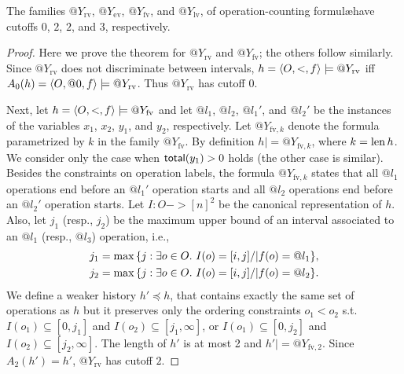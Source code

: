 \begin{theorem}
  \label{lem:cutoff}

  The families $@Y_\mathrm{rv}$, $@Y_\mathrm{ev}$, $@Y_\mathrm{fv}$, and
  $@Y_\mathrm{lv}$, of operation-counting formul\ae have cutoffs $0$, $2$, $2$,
  and $3$, respectively.

\end{theorem}

\begin{proof}

  Here we prove the theorem for $@Y_\mathrm{rv}$ and $@Y_\mathrm{fv}$; the
  others follow similarly. Since $@Y_\mathrm{rv}$ does not discriminate
  between intervals, $h = \left\langle {O,<,f} \right\rangle |= @Y_\mathrm{rv}$ if{f} $A_0(h) =
  \left\langle {O,@0,f} \right\rangle |= @Y_\mathrm{rv}$. Thus $@Y_\mathrm{rv}$ has cutoff $0$.

  Next, let $h = \left\langle {O,<,f} \right\rangle |= @Y_\mathrm{fv}$ and let $@l_1$, $@l_2$,
  $@l_1'$, and $@l_2'$ be the instances of the variables $x_1$, $x_2$, $y_1$,
  and $y_2$, respectively. Let $@Y_{\mathrm{fv},k}$ denote the formula
  parametrized by $k$ in the family $@Y_\mathrm{fv}$. By definition $h |=
  @Y_{\mathrm{fv},k}$, where $k = \operatorname{len} h$. We consider only the case when
  $\mathsf{total}(y_1)>0$ holds (the other case is similar). Besides the constraints on
  operation labels, the formula $@Y_{\mathrm{fv},k}$ states that all $@l_1$
  operations end before an $@l_1'$ operation starts and all $@l_2$ operations
  end before an $@l_2'$ operation starts. Let $I:O->[n]^2$ be the canonical
  representation of $h$. Also, let $j_1$ (resp., $j_2$) be the maximum upper
  bound of an interval associated to an $@l_1$ (resp., $@l_3$) operation, i.e.,
  \begin{align*}
    j_1 = \max{\{ j:\exists o\in O.\ I(o) = [i,j] /| f(o)=@l_1 \}}, \\
    j_2 = \max{\{ j:\exists o\in O.\ I(o) = [i,j] /| f(o)=@l_2 \}}.
  \end{align*}
  We define a weaker history $h'\preceq h$, that contains exactly the same set
  of operations as $h$ but it preserves only the ordering constraints $o_1<o_2$
  s.t. $I(o_1)\subseteq [0,j_1]$ and $I(o_2)\subseteq [j_1,\infty]$, or
  $I(o_1)\subseteq [0,j_2]$ and $I(o_2)\subseteq [j_2,\infty]$. The length of
  $h'$ is at most 2
  and $h'|= @Y_{\mathrm{fv},2}$. Since $A_2(h') = h'$, $@Y_\mathrm{rv}$ has
  cutoff $2$.
\end{proof}

